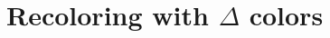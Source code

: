 \documentclass[11pt,xcolor=dvipsnames,presentation]{beamer}
\DeclareMathOperator{\diam}{diam}
\DeclareMathOperator{\tw}{tw}
\begin{document}


\section{Recoloring with $\Delta$ colors}
\end{document}
